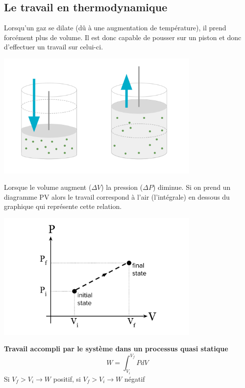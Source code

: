\documentclass{article}
\begin{document}
\subsection{Le travail en thermodynamique}
Lorsqu'un gaz se dilate (dû à une augmentation de température), il prend forcément plus de volume. Il est donc capable de pousser sur un piston et donc d'effectuer un travail sur celui-ci.

\begin{center}
    \includegraphics[width=10cm]{Image/PistonTravail.png}
\end{center}
Lorsque le volume augment ($\Delta V$) la pression ($\Delta P$) diminue. Si on prend un diagramme PV alors le travail correspond à l'air (l'intégrale) en dessous du graphique qui représente cette relation.


\begin{center}
    \includegraphics[width=10cm]{Image/DiagramPV.png}
\end{center}
\newline

\noindent
\textbf{Travail accompli par le système dans un processus quasi statique}
\[W = \int_{V_i}^{V_f}P dV\]
Si $V_f > V_i \rightarrow W$ positif, si $V_f > V_i \rightarrow W$ négatif
\newline
\end{document}
